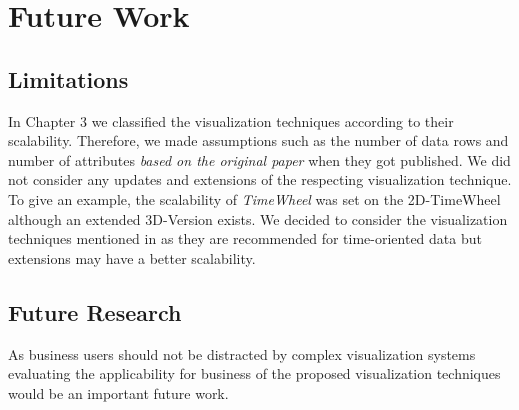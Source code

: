\chapter{Future Work}
\label{Future Work}

\section{Limitations}
In Chapter 3 we classified the visualization techniques according to their scalability. Therefore, we made assumptions such as the number of data rows and number of attributes \textit{based on the original paper} when they got published. We did not consider any updates and extensions of the respecting visualization technique. To give an example, the scalability of \textit{TimeWheel} was set on the 2D-TimeWheel although an extended 3D-Version exists. We decided to consider the visualization techniques mentioned in\cite{Aigner2011} as they are recommended for time-oriented data but extensions may have a better scalability.  
\section{Future Research}


As business users should not be distracted by complex visualization systems \cite{Tegarden1999} evaluating the applicability for business of the proposed visualization techniques would be an important future work.
